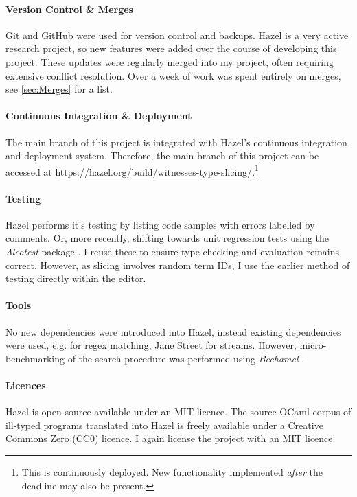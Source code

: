 \paragraph{Version Control \& Merges} Git and GitHub were used for version control and backups. Hazel is a very active research project, so new features were added over the course of developing this project. These updates were regularly merged into my project, often requiring extensive conflict resolution. Over a week of work was spent entirely on merges, see \cref{sec:Merges} for a list.
\paragraph{Continuous Integration \& Deployment} The main branch of this project is integrated with Hazel's continuous integration and deployment system. Therefore, the main branch of this project can be accessed at \url{https://hazel.org/build/witnesses-type-slicing/}.\footnote{This is continuously deployed. New functionality implemented \textit{after} the deadline may also be present.}
\paragraph{Testing} Hazel performs it's testing by listing code samples with errors labelled by comments. Or, more recently, shifting towards unit regression tests using the \textit{Alcotest} package \cite{AlcoTest}. I reuse these to ensure type checking and evaluation remains correct. However, as slicing involves random term IDs, I use the earlier method of testing directly within the editor.
\paragraph{Tools} No new dependencies were introduced into Hazel, instead existing dependencies were used, e.g.  \cite{JSOO} for regex matching, Jane Street  \cite{Base} for streams. However, micro-benchmarking of the search procedure was performed using \textit{Bechamel} \cite{Bechamel}.

\paragraph{Licences} Hazel is open-source available under an MIT licence. The source OCaml corpus of ill-typed programs \cite{OCamlCorpus} translated into Hazel is freely available under a Creative Commons Zero (CC0) licence. I again license the project with an MIT licence.
